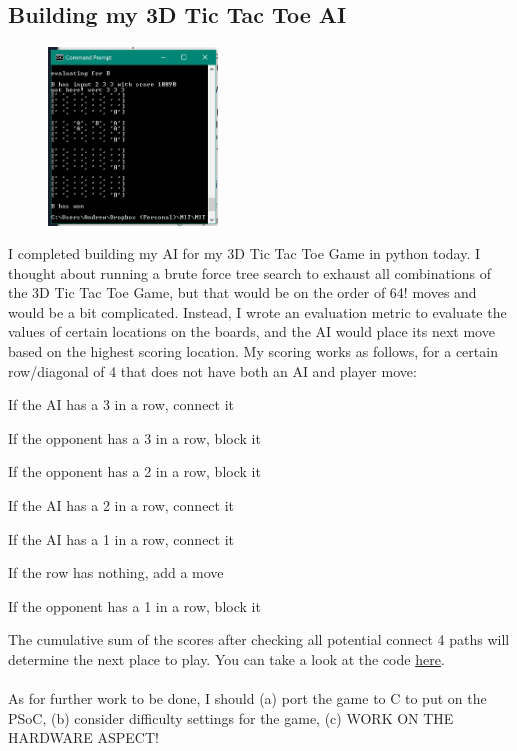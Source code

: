\documentclass[12pt,twoside]{article}
\newenvironment{tight_enumerate}{
\begin{enumerate}
  \setlength{\itemsep}{0pt}
  \setlength{\parskip}{0pt}
}{\end{enumerate}}
\begin{document}
\subsection{Building my 3D Tic Tac Toe AI}
\begin{figure}
\centering
\includegraphics[width = 0.4\textwidth]{Pics/4-25b.png} 
\end{figure}
I completed building my AI for my 3D Tic Tac Toe Game in python today. I thought about running a brute force tree search to exhaust all combinations of the 3D Tic Tac Toe Game, but that would be on the order of 64! moves and would be a bit complicated. Instead, I wrote an evaluation metric to evaluate the values of certain locations on the boards, and the AI would place its next move based on the highest scoring location. My scoring works as follows, for a certain row/diagonal of 4 that does not have both an AI and player move:
\begin{tight_enumerate}
\item If the AI has a 3 in a row, connect it
\item If the opponent has a 3 in a row, block it
\item If the opponent has a 2 in a row, block it
\item If the AI has a 2 in a row, connect it
\item If the AI has a 1 in a row, connect it
\item If the row has nothing, add a move
\item If the opponent has a 1 in a row, block it
\end{tight_enumerate}
The cumulative sum of the scores after checking all potential connect 4 paths will determine the next place to play. You can take a look at the code \href{https://github.com/qandrew/6.115-final-project/blob/master/Code/tic_tac_toe_ai.py}{here}.
\\
\\ As for further work to be done, I should (a) port the game to C to put on the PSoC, (b) consider difficulty settings for the game, (c) WORK ON THE HARDWARE ASPECT!
\end{document}
